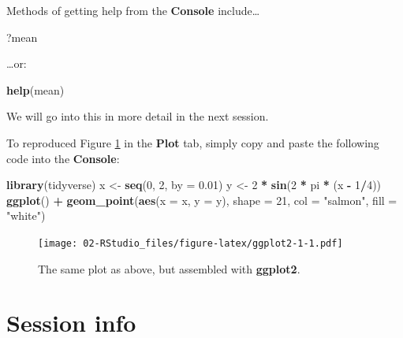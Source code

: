 \documentclass[
]{book}
\newenvironment{Shaded}{\begin{snugshade}}{\end{snugshade}}
\newcommand{\DataTypeTok}[1]{\textcolor[rgb]{0.13,0.29,0.53}{#1}}
\newcommand{\DecValTok}[1]{\textcolor[rgb]{0.00,0.00,0.81}{#1}}
\newcommand{\FloatTok}[1]{\textcolor[rgb]{0.00,0.00,0.81}{#1}}
\newcommand{\KeywordTok}[1]{\textcolor[rgb]{0.13,0.29,0.53}{\textbf{#1}}}
\newcommand{\NormalTok}[1]{#1}
\newcommand{\OperatorTok}[1]{\textcolor[rgb]{0.81,0.36,0.00}{\textbf{#1}}}
\newcommand{\StringTok}[1]{\textcolor[rgb]{0.31,0.60,0.02}{#1}}
\begin{document}
Methods of getting help from the \textbf{Console} include\ldots{}

\begin{Shaded}
\begin{Highlighting}[]
\NormalTok{?mean}
\end{Highlighting}
\end{Shaded}

\ldots or:

\begin{Shaded}
\begin{Highlighting}[]
\KeywordTok{help}\NormalTok{(mean)}
\end{Highlighting}
\end{Shaded}

We will go into this in more detail in the next session.

To reproduced Figure \ref{fig:ggplot2-1} in the \textbf{Plot} tab, simply copy and paste the following code into the \textbf{Console}:

\begin{Shaded}
\begin{Highlighting}[]
\KeywordTok{library}\NormalTok{(tidyverse)}
\NormalTok{x <{-}}\StringTok{ }\KeywordTok{seq}\NormalTok{(}\DecValTok{0}\NormalTok{, }\DecValTok{2}\NormalTok{, }\DataTypeTok{by =} \FloatTok{0.01}\NormalTok{)}
\NormalTok{y <{-}}\StringTok{ }\DecValTok{2} \OperatorTok{*}\StringTok{ }\KeywordTok{sin}\NormalTok{(}\DecValTok{2} \OperatorTok{*}\StringTok{ }\NormalTok{pi }\OperatorTok{*}\StringTok{ }\NormalTok{(x }\OperatorTok{{-}}\StringTok{ }\DecValTok{1}\OperatorTok{/}\DecValTok{4}\NormalTok{))}
\KeywordTok{ggplot}\NormalTok{() }\OperatorTok{+}
\StringTok{  }\KeywordTok{geom\_point}\NormalTok{(}\KeywordTok{aes}\NormalTok{(}\DataTypeTok{x =}\NormalTok{ x, }\DataTypeTok{y =}\NormalTok{ y), }\DataTypeTok{shape =} \DecValTok{21}\NormalTok{, }\DataTypeTok{col =} \StringTok{"salmon"}\NormalTok{, }\DataTypeTok{fill =} \StringTok{"white"}\NormalTok{)}
\end{Highlighting}
\end{Shaded}

\begin{figure}
\centering
\texttt{[image: 02-RStudio\_files/figure-latex/ggplot2-1-1.pdf]}
\caption{\label{fig:ggplot2-1}The same plot as above, but assembled with \textbf{ggplot2}.}
\end{figure}

\hypertarget{session-info-1}{%
\section{Session info}\label{session-info-1}}
\end{document}
